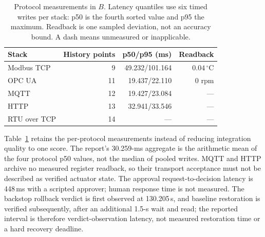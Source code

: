 \begin{table}[!t]
\centering
\caption{Protocol measurements in $B$. Latency quantiles use six timed writes per stack: p50 is the fourth sorted value and p95 the maximum. Readback is one sampled deviation, not an accuracy bound. A dash means unmeasured or inapplicable.}
\label{tab:plc}
\footnotesize
\setlength{\tabcolsep}{2.9pt}
\begin{tabular}{@{}lrrr@{}}
\toprule
Stack & History points & p50/p95 (ms) & Readback \\
\midrule
Modbus TCP & 9 & 49.232/101.164 & $0.04\,^\circ$C \\
OPC UA & 11 & 19.437/22.110 & 0 rpm \\
MQTT & 12 & 19.427/23.084 & --- \\
HTTP & 13 & 32.941/33.546 & --- \\
RTU over TCP & 14 & --- & --- \\
\bottomrule
\end{tabular}
\end{table}

Table~\ref{tab:plc} retains the per-protocol measurements instead of reducing
integration quality to one score. The report's 30.259-ms aggregate is the
arithmetic mean of the four protocol p50 values, not the median of pooled
writes. MQTT and HTTP archive no measured register readback, so their
transport acceptance must not be described as verified actuator state. The
approval request-to-decision latency is 448\,ms with a scripted approver;
human response time is not measured. The backstop rollback verdict is first
observed at 130.205\,s, and baseline restoration is verified subsequently,
after an additional 1.5-s wait and read; the reported interval is therefore
verdict-observation latency, not measured restoration time or a hard recovery
deadline.

